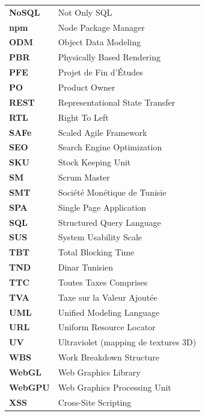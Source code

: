 \begin{longtable}{>{\bfseries\color{marron}}p{3cm} p{11cm}}
NoSQL   & Not Only SQL \\
npm     & Node Package Manager \\
ODM     & Object Data Modeling \\
PBR     & Physically Based Rendering \\
PFE     & Projet de Fin d'Études \\
PO      & Product Owner \\
REST    & Representational State Transfer \\
RTL     & Right To Left \\
SAFe    & Scaled Agile Framework \\
SEO     & Search Engine Optimization \\
SKU     & Stock Keeping Unit \\
SM      & Scrum Master \\
SMT     & Société Monétique de Tunisie \\
SPA     & Single Page Application \\
SQL     & Structured Query Language \\
SUS     & System Usability Scale \\
TBT     & Total Blocking Time \\
TND     & Dinar Tunisien \\
TTC     & Toutes Taxes Comprises \\
TVA     & Taxe sur la Valeur Ajoutée \\
UML     & Unified Modeling Language \\
URL     & Uniform Resource Locator \\
UV      & Ultraviolet (mapping de textures 3D) \\
WBS     & Work Breakdown Structure \\
WebGL   & Web Graphics Library \\
WebGPU  & Web Graphics Processing Unit \\
XSS     & Cross-Site Scripting \\
\bottomrule
\end{longtable}
